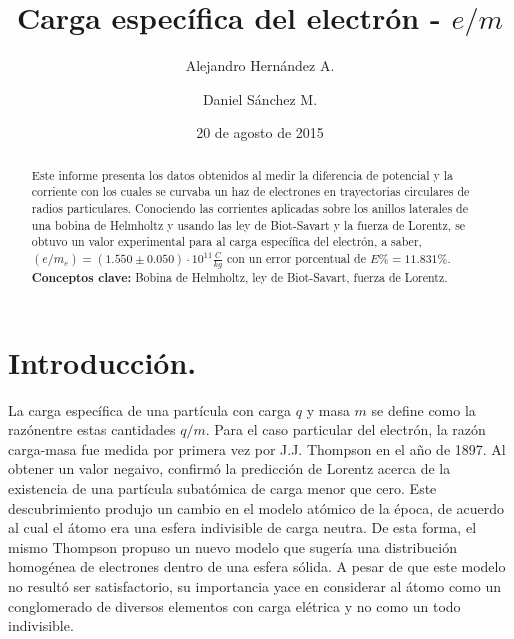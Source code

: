 \documentclass[prb,aps,twocolumn,preprintnumbers,amsmath,amssymb]{revtex4}
\begin{document}
\title{Carga específica del electrón - $e/m$}%

\author{Alejandro Hernández A.}%
\author{Daniel Sánchez M.}%
%
\date{20 de agosto de 2015\\}%

\begin{abstract}
Este informe presenta los datos obtenidos al medir la diferencia de potencial y la corriente con los cuales se curvaba un haz de electrones en trayectorias circulares de radios particulares. Conociendo las corrientes aplicadas sobre los anillos laterales de una bobina de Helmholtz y usando las ley de Biot-Savart y la fuerza de Lorentz, se obtuvo un valor experimental para al carga específica del electrón, a saber, $\left( e/m_{e} \right) = (1.550 \pm 0.050) \cdot 10^{11} \frac{C}{kg}$ con un error porcentual de  $E\% = 11.831\%$.
\\

\noindent \textbf{Conceptos clave:} Bobina de Helmholtz, ley de Biot-Savart, fuerza de Lorentz.
\end{abstract}
                             
\maketitle

\section{\label{sec:level1}Introducción.}

La carga específica de una partícula con carga $q$ y masa $m$ se define como la razónentre estas cantidades $q/m$. Para el caso particular del electrón, la razón carga-masa fue medida por primera vez por J.J. Thompson en el año de 1897. Al obtener un valor negaivo, confirmó la predicción de Lorentz acerca de la existencia de una partícula subatómica de carga menor que cero. Este descubrimiento produjo un cambio en el modelo atómico de la época, de acuerdo al cual el átomo era una esfera indivisible de carga neutra. De esta forma, el mismo Thompson propuso un nuevo modelo que sugería una distribución homogénea de electrones dentro de una esfera sólida. A pesar de que este modelo no resultó ser satisfactorio, su importancia yace en considerar al átomo como un conglomerado de diversos elementos con carga elétrica y no como un todo indivisible.\\
\end{document}
